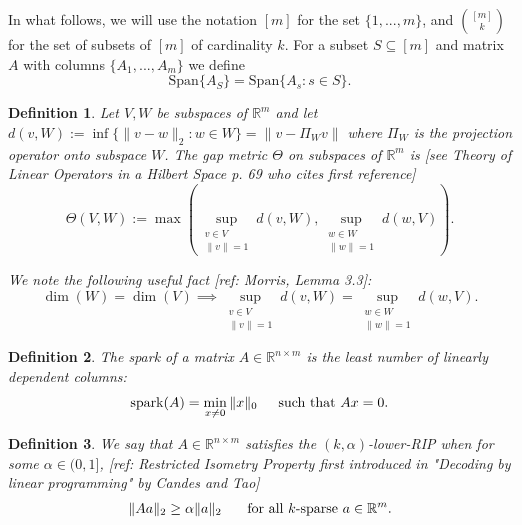 \documentclass[journal,onecolumn]{IEEEtran}
\newtheorem{definition}{Definition}
\begin{document}
In what follows, we will use the notation $[m]$ for the set $\{1, ..., m\}$, and ${[m] \choose k}$ for the set of subsets of $[m]$ of cardinality $k$. For a subset $S \subseteq [m]$ and matrix $A$ with columns $\{A_1,...,A_m\}$ we define
\begin{equation*}
\text{Span}\{A_S\} = \text{Span}\{A_s: s \in S\}.
\end{equation*}

\begin{definition}
Let $V, W$ be subspaces of $\mathbb{R}^m$ and let $d(v,W) := \inf\{\|v-w\|_2: w \in W\} = \|v - \Pi_W v\|$ where $\Pi_W$ is the projection operator onto subspace $W$. The \emph{gap} metric $\Theta$ on subspaces of $\mathbb{R}^{m}$ is [see Theory of Linear Operators in a Hilbert Space p. 69 who cites first reference]
\begin{equation}\label{SubspaceMetric}
\Theta(V,W) := \max\left( \sup_{\substack{v \in V \\ \|v\| = 1}} d(v,W), \sup_{\substack{w \in W \\ \|w\| = 1}} d(w,V) \right).
\end{equation}

We note the following useful fact [ref: Morris, Lemma 3.3]:
\begin{equation}\label{SubspaceMetricSameDim}
\dim(W) = \dim(V) \implies \sup_{\substack{v \in V \\ \|v\| = 1}}  d(v,W)  = \sup_{\substack{w \in W \\ \|w\| = 1}} d(w,V).
\end{equation}
\end{definition}

\begin{definition}\label{SparkDef}
The \emph{spark} of a matrix $A \in  \mathbb R^{n \times m}$ is the least number of linearly dependent columns:
\begin{align}
\text{spark}(A) = \min_{x \neq 0} \|x\|_0 \indent \text{such that } Ax = 0.
\end{align}
\end{definition}

\begin{definition}\label{RestrictedIsometryProperty}
We say that $A \in  \mathbb R^{n \times m}$ satisfies the \emph{$(k,\alpha)$-lower-RIP}  when for some $\alpha \in (0,1]$, [ref: Restricted Isometry Property first introduced in "Decoding by linear programming" by Candes and Tao]
\begin{align*}
\|Aa\|_2 \geq  \alpha \|a\|_2 \indent \text{ for all $k$-sparse } a \in \mathbb{R}^m.
\end{align*}
\end{definition}
\end{document}
